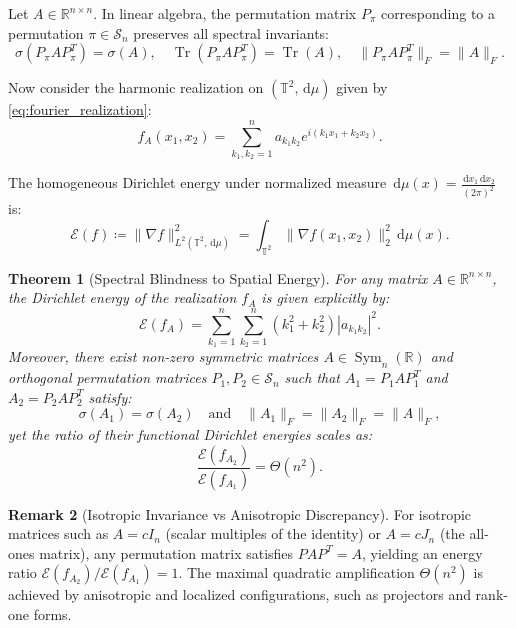 \documentclass[11pt,a4paper,reqno]{amsart}
\newtheorem{theorem}{Theorem}[section]
\theoremstyle{definition}
\newtheorem{remark}[theorem]{Remark}
\numberwithin{equation}{section}
\providecommand{\R}{\mathbb{R}}
\newcommand{\Tor}{\mathbb{T}}
\newcommand{\Tr}{\operatorname{Tr}}
\newcommand{\dif}{\,\mathrm{d}}
\begin{document}
Let $A \in \R^{n \times n}$. In linear algebra, the permutation matrix $P_\pi$ corresponding to a permutation $\pi \in \mathcal{S}_n$ preserves all spectral invariants:
\begin{equation}
    \sigma(P_\pi A P_\pi^T) = \sigma(A), \quad \Tr(P_\pi A P_\pi^T) = \Tr(A), \quad \|P_\pi A P_\pi^T\|_F = \|A\|_F.
\end{equation}

Now consider the harmonic realization on $(\Tor^2, \dif\mu)$ given by \eqref{eq:fourier_realization}:
\begin{equation}
    f_A(x_1, x_2) = \sum_{k_1, k_2 = 1}^n a_{k_1 k_2} e^{i (k_1 x_1 + k_2 x_2)}.
\end{equation}

The homogeneous Dirichlet energy under normalized measure $\dif\mu(x) = \frac{\dif x_1 \dif x_2}{(2\pi)^2}$ is:
\begin{equation}
    \mathcal{E}(f) \coloneqq \|\nabla f\|_{L^2(\Tor^2, \dif\mu)}^2 = \int_{\Tor^2} \|\nabla f(x_1, x_2)\|_2^2 \dif\mu(x).
\end{equation}

\begin{theorem}[Spectral Blindness to Spatial Energy]
\label{thm:dirichlet_blindness}
For any matrix $A \in \R^{n \times n}$, the Dirichlet energy of the realization $f_A$ is given explicitly by:
\begin{equation}
    \label{eq:dirichlet_energy_formula}
    \mathcal{E}(f_A) = \sum_{k_1=1}^n \sum_{k_2=1}^n (k_1^2 + k_2^2) |a_{k_1 k_2}|^2.
\end{equation}
Moreover, there exist non-zero symmetric matrices $A \in \operatorname{Sym}_n(\R)$ and orthogonal permutation matrices $P_1, P_2 \in \mathcal{S}_n$ such that $A_1 = P_1 A P_1^T$ and $A_2 = P_2 A P_2^T$ satisfy:
\begin{equation}
    \sigma(A_1) = \sigma(A_2) \quad \text{and} \quad \|A_1\|_F = \|A_2\|_F = \|A\|_F,
\end{equation}
yet the ratio of their functional Dirichlet energies scales as:
\begin{equation}
    \frac{\mathcal{E}(f_{A_2})}{\mathcal{E}(f_{A_1})} = \Theta(n^2).
\end{equation}
\end{theorem}

\begin{remark}[Isotropic Invariance vs Anisotropic Discrepancy]
For isotropic matrices such as $A = c I_n$ (scalar multiples of the identity) or $A = c J_n$ (the all-ones matrix), any permutation matrix satisfies $P A P^T = A$, yielding an energy ratio $\mathcal{E}(f_{A_2})/\mathcal{E}(f_{A_1}) = 1$. The maximal quadratic amplification $\Theta(n^2)$ is achieved by anisotropic and localized configurations, such as projectors and rank-one forms.
\end{remark}
\end{document}
